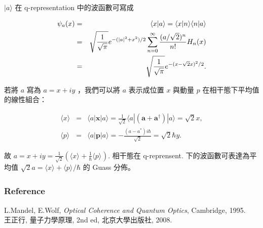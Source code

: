 \documentclass[12pt]{beamer}
\newcommand{\bra}[1]{\langle#1|}
\newcommand{\ket}[1]{|#1\rangle }
\newcommand{\braket}[2]{\langle#1|#2\rangle }
\newcommand{\expect}[2]{\langle #1\rangle_{#2}}
\begin{document}
\begin{frame}
$ \ket{a} $ 在 q-representation 中的波函數可寫成

\begin{eqnarray}
\notag\psi_a(x)&=&\braket{x}{a}=\braket{x}{n}\braket{n}{a}\\
\notag&=& \sqrt{\frac{1}{\sqrt{\pi}}}e^{-(|a|^2+x^2)/2}\sum_{n=0}^\infty\frac{(a/\sqrt{2})^n}{n!}H_n(x)\\
&=&\sqrt{\frac{1}{\sqrt{\pi}}}e^{-(x-\sqrt{2}x)^2/2}.
\end{eqnarray}
\end{frame}

\begin{frame}
若將 $ a $ 寫為 $ a=x+iy $ ，我們可以將 $ a $ 表示成位置 $ x $ 與動量 $ p $ 在相干態下平均值的線性組合：

\begin{eqnarray}
\expect{x}{}&=&\bra{a}\bm{x}\ket{a}=\frac{1}{\sqrt{2}}\bra{a}(\bm{a}+\bm{a}^\dag)\ket{a}=\sqrt{2}x,\\
\expect{p}{}&=&\bra{a}\bm{p}\ket{a}=-\frac{(a-a^*)i\hbar}{\sqrt{2}}=\sqrt{2}\hbar y.
\end{eqnarray}
\end{frame}

\begin{frame}
故 $ \displaystyle a=x+iy=\frac{1}{\sqrt{2}}\left(\expect{x}{}+\frac{1}{\hbar}\expect{p}{}\right) $. 相干態在 q-reprensent. 下的波函數可表達為平均值 $ \sqrt{2}a=\expect{x}{}+\expect{p}{}/\hbar $ 的 Guass 分佈。

\end{frame}

\begin{frame}
\frametitle{Reference}
\noindent[1] L.Mandel, E.Wolf, \textsl{Optical Coherence and Quantum Optics}, Cambridge, 1995.\\

\noindent[2] 王正行, 量子力學原理, 2nd ed, 北京大學出版社, 2008.
\end{frame}
\end{document}
